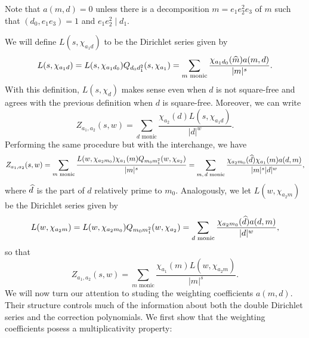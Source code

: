 \documentclass[12pt,reqno,oneside]{amsart}
\begin{document}
    \begin{remark}\label{rem:weighting_coefficient_remark}
        Note that $a(m,d) = 0$ unless there is a decomposition $m = e_{1}e_{2}^{2}e_{3}$ of $m$ such that $(d_{0},e_{1}e_{3}) = 1$ and $e_{1}e_{2}^{2} \mid d_{1}$.
    \end{remark}

    We will define $L(s,\chi_{a_{1}d})$ to be the Dirichlet series given by
    \[
        L(s,\chi_{a_{1}d}) = L(s,\chi_{a_{1}d_{0}})Q_{d_{0}d_{1}^{2}}(s,\chi_{a_{1}}) = \sum_{\text{$m$ monic}}\frac{\chi_{a_{1}d_{0}}(\widehat{m})a(m,d)}{|m|^{s}}.
    \]
    With this definition, $L(s,\chi_{d})$ makes sense even when $d$ is not square-free and agrees with the previous definition when $d$ is square-free. Moreover, we can write
    \[
        Z_{a_{1},a_{2}}(s,w) = \sum_{\text{$d$ monic}}\frac{\chi_{a_{2}}(d)L(s,\chi_{a_{1}d})}{|d|^{w}}.
    \]
    Performing the same procedure but with the interchange, we have
    \[
        Z_{a_{1},a_{2}}(s,w) = \sum_{\text{$m$ monic}}\frac{L(w,\chi_{a_{2}m_{0}})\chi_{a_{1}}(m)Q_{m_{0}m_{1}^{2}}(w,\chi_{a_{2}})}{|m|^{s}} = \sum_{\text{$m,d$ monic}}\frac{\chi_{a_{2}m_{0}}(\widehat{d})\chi_{a_{1}}(m)a(d,m)}{|m|^{s}|d|^{w}},
    \]
    where $\widehat{d}$ is the part of $d$ relatively prime to $m_{0}$. Analogously, we let $L(w,\chi_{a_{2}m})$ be the Dirichlet series given by
    \[
        L(w,\chi_{a_{2}m}) = L(w,\chi_{a_{2}m_{0}})Q_{m_{0}m_{1}^{2}}(w,\chi_{a_{2}}) = \sum_{\text{$d$ monic}}\frac{\chi_{a_{2}m_{0}}(\widehat{d})a(d,m)}{|d|^{w}},
    \]
    so that
    \[
        Z_{a_{1},a_{2}}(s,w) = \sum_{\text{$m$ monic}}\frac{\chi_{a_{1}}(m)L(w,\chi_{a_{2}m})}{|m|^{s}}.
    \]
    We will now turn our attention to studing the weighting coefficients $a(m,d)$. Their structure controls much of the information about both the double Dirichlet series and the correction polynomials. We first show that the weighting coefficients posess a multiplicativity property:
\end{document}
